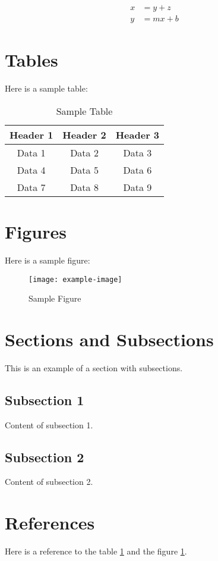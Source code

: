 \documentclass{article}
\begin{document}
\begin{align}
x &= y + z \\
y &= mx + b
\end{align}


\section{Tables}
Here is a sample table:


\begin{table}[h!]
\centering
\begin{tabular}{|c|c|c|}
\hline
Header 1 & Header 2 & Header 3 \\
\hline
Data 1 & Data 2 & Data 3 \\
Data 4 & Data 5 & Data 6 \\
Data 7 & Data 8 & Data 9 \\
\hline
\end{tabular}
\caption{Sample Table}
\label{table:1}
\end{table}


\section{Figures}
Here is a sample figure:


\begin{figure}[h!]
\centering
\texttt{[image: example-image]}
\caption{Sample Figure}
\label{fig:1}
\end{figure}


\section{Sections and Subsections}
This is an example of a section with subsections.


\subsection{Subsection 1}
Content of subsection 1.


\subsection{Subsection 2}
Content of subsection 2.


\section{References}
Here is a reference to the table \ref{table:1} and the figure \ref{fig:1}.
\end{document}
